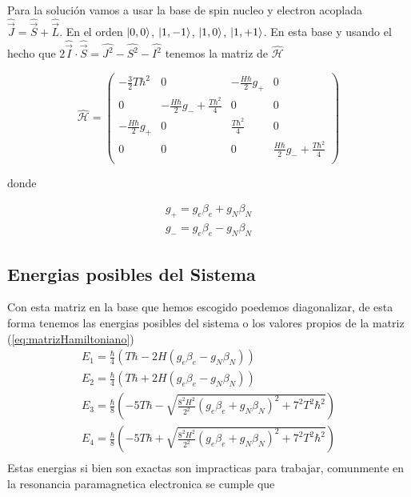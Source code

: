 \documentclass[twocolumn,
amssymb,prb,aps,superscriptaddress]{revtex4}
\begin{document}
Para la solución vamos a usar la base de spin nucleo y electron acoplada $\hat{\vec{J}} = \hat{\vec{S}} + \hat{\vec{L}}$. En el orden $\ket{0,0}$, $\ket{1,-1}$, $\ket{1,0}$, $\ket{1,+1}$. En esta base y usando el hecho que $ 2 \hat{\vec{I}} \cdot \hat{\vec{S}} = \hat{J^2} - \hat{S^2} - \hat{I^2} $ tenemos la matriz de $\mathcal{\hat{H}}$

\begin{equation}
    \label{eq:matrizHamiltoniano}
    \hat{\mathcal{H}} =     
\begin{pmatrix}

    -\frac{3}{2} T \hbar^2 & 0 & - \frac{H \hbar}{2} g_+ & 0 \\

    0 & -\frac{H \hbar}{2} g_- + \frac{T \hbar^2}{4} & 0 & 0 \\

    - \frac{H \hbar}{2} g_+ & 0 & \frac{T \hbar^2}{4} & 0 \\

    0 & 0 & 0 & \frac{H \hbar}{2} g_- + \frac{T \hbar^2}{4} \\

\end{pmatrix}
\end{equation}

donde

\begin{align}
    \label{eq:notacionG}
    g_+ = g_e \beta_e + g_N \beta_N \\
    g_- = g_e \beta_e - g_N \beta_N    
\end{align}

\subsection{Energias posibles del Sistema}


Con esta matriz en la base que hemos escogido poedemos diagonalizar, de esta forma tenemos las energias posibles del sistema o los valores propios de la matriz (\ref{eq:matrizHamiltoniano})
    \begin{align*}
        E_1 = \frac{\hbar}{4}(T \hbar - 2 H (g_e \beta_e - g_N \beta_N)) \\
        E_2 = \frac{\hbar}{4}(T \hbar + 2 H (g_e \beta_e - g_N \beta_N)) \\
        E_3 = \frac{\hbar}{8}\left(-5 T \hbar - \sqrt{\frac{8^2 H^2}{2^2} (g_e \beta_e + g_N \beta_N)^2 + 7^2 T^2 \hbar^2}\right) \\
        E_4 = \frac{\hbar}{8}\left(-5 T \hbar + \sqrt{\frac{8^2 H^2}{2^2} (g_e \beta_e + g_N \beta_N)^2 + 7^2 T^2 \hbar^2} \right) \\
    \end{align*}
Estas energias si bien son exactas son impracticas para trabajar, comunmente en la resonancia paramagnetica electronica se cumple que 
\end{document}
